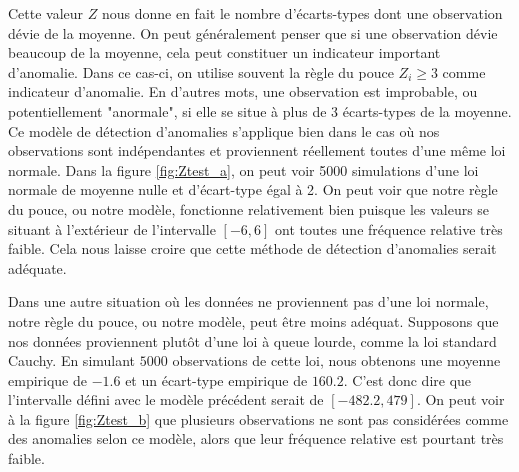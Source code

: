 Cette valeur $Z$ nous donne en fait le nombre d'écarts-types dont une observation dévie de la moyenne. On peut généralement penser que si une observation dévie beaucoup de la moyenne, cela peut constituer un indicateur important d'anomalie. Dans ce cas-ci, on utilise souvent la règle du pouce $Z_i \ge 3$ comme indicateur d'anomalie. En d'autres mots, une observation est improbable, ou potentiellement "anormale", si elle se situe à plus de 3 écarts-types de la moyenne. Ce modèle de détection d'anomalies s'applique bien dans le cas où nos observations sont indépendantes et proviennent réellement toutes d'une même loi normale. Dans la figure \ref{fig:Ztest_a}, on peut voir 5000 simulations d'une loi normale de moyenne nulle et d'écart-type égal à 2. On peut voir que notre règle du pouce, ou notre modèle, fonctionne relativement bien puisque les valeurs se situant à l'extérieur de l'intervalle $[-6, 6]$ ont toutes une fréquence relative très faible. Cela nous laisse croire que cette méthode de détection d'anomalies serait adéquate. 

Dans une autre situation où les données ne proviennent pas d'une loi normale, notre règle du pouce, ou notre modèle, peut être moins adéquat. Supposons que nos données proviennent plutôt d'une loi à queue lourde, comme la loi standard Cauchy. En simulant $5000$ observations de cette loi, nous obtenons une moyenne empirique de $-1.6$ et un écart-type empirique de $160.2$. C'est donc dire que l'intervalle défini avec le modèle précédent serait de $[-482.2, 479]$. On peut voir à la figure \ref{fig:Ztest_b} que plusieurs observations ne sont pas considérées comme des anomalies selon ce modèle, alors que leur fréquence relative est pourtant très faible.

